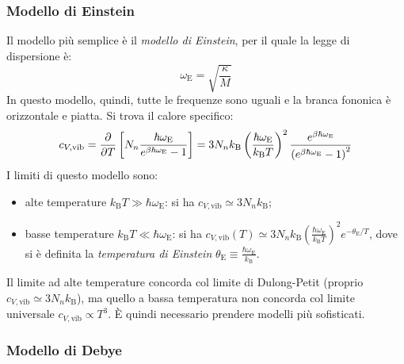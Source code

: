 \subsubsection{Modello di Einstein}

Il modello più semplice è il \textit{modello di Einstein}, per il quale la legge di dispersione è:
\begin{equation}
	\omega_\text{E} = \sqrt{\frac{\kappa}{M}}
\end{equation}
In questo modello, quindi, tutte le frequenze sono uguali e la branca fononica è orizzontale e piatta. Si trova il calore specifico:
\begin{equation*}
	c_{V,\text{vib}} = \frac{\partial}{\partial T} \left[ N_n \frac{\hbar \omega_\text{E}}{e^{\beta \hbar \omega_\text{E}} - 1} \right] = 3 N_n k_\text{B} \left( \frac{\hbar \omega_\text{E}}{k_\text{B} T} \right)^2 \frac{e^{\beta \hbar \omega_\text{E}}}{\left( e^{\beta \hbar \omega_\text{E}} - 1 \right)^2}
\end{equation*}
I limiti di questo modello sono:
\begin{itemize}
	\item alte temperature $ k_\text{B} T \gg \hbar \omega_\text{E} $: si ha $ c_{V,\text{vib}} \simeq 3 N_n k_\text{B} $;
	\item basse temperature $ k_\text{B} T \ll \hbar \omega_\text{E} $: si ha $ c_{V,\text{vib}}(T) \simeq 3 N_n k_\text{B} \left( \frac{\hbar \omega_\text{E}}{k_\text{B} T} \right)^2 e^{- \theta_\text{E} / T} $, dove si è definita la \textit{temperatura di Einstein} $ \theta_\text{E} \equiv \frac{\hbar \omega_\text{E}}{k_\text{B}} $.
\end{itemize}
Il limite ad alte temperature concorda col limite di Dulong-Petit (proprio $ c_{V,\text{vib}} \simeq 3 N_n k_\text{B} $), ma quello a bassa temperatura non concorda col limite universale $ c_{V,\text{vib}} \propto T^3 $. È quindi necessario prendere modelli più sofisticati.

\subsubsection{Modello di Debye}

